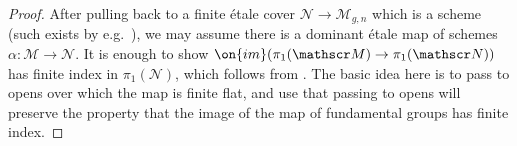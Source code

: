 \begin{proof}
	After pulling back to a finite \'etale cover $\mathscr
	N \to \mathscr M_{g,n}$ which is a scheme (such exists by e.g.~\cite[Proposition 2.3.4]{pikaart-dejong}),
	we may assume there is a dominant \'etale map of schemes
	$\alpha: \mathscr M \to \mathscr N$. It is enough to show $\on{im}(\pi_1(\mathscr M) \to \pi_1(\mathscr N))$
	has finite index in $\pi_1(\mathscr N)$, which follows from \cite[Lemma
	4.19]{debarre:higher-dimensional}.
	The basic idea here is to pass to opens over which the map is finite
	flat, and use that passing to opens will preserve the property that the
	image of the map of fundamental groups has finite index.
%
\end{proof}


